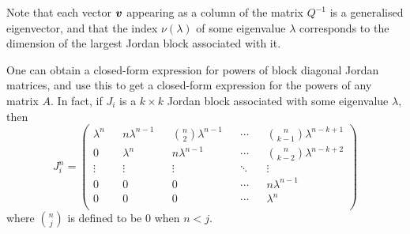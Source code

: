 Note that each vector $\boldsymbol{v}$ appearing as a column of the
matrix $Q^{-1}$ is a generalised eigenvector, and that the
index $\nu(\lambda)$ of some eigenvalue $\lambda$ corresponds to the
dimension of the largest Jordan block associated with it.

One can obtain a closed-form expression for powers of block diagonal
Jordan matrices, and use this to get a closed-form expression for
the powers of any matrix $A$. In fact, if $J_{i}$ is a
$k\times k$ Jordan block associated with some eigenvalue $\lambda$,
then
\begin{equation}
\label{eq:jordan_powers}
J_{i}^{n}=\begin{pmatrix}
\lambda^{n}	&&	n\lambda^{n-1}	&&	{n\choose 2}\lambda^{n-1}	&&
\cdots		&&	{n\choose k-1}\lambda^{n-k+1}				\\
0			&&	\lambda^{n}		&&	n\lambda^{n-1}				&&
\cdots		&&	{n\choose k-2}\lambda^{n-k+2}				\\
\vdots	&&	\vdots	&&	\vdots	&&	\ddots	&&	\vdots			\\
0		&&	0		&&	0		&&	\cdots	&&	n\lambda^{n-1}	\\
0		&&	0		&&	0		&&	\cdots	&&	\lambda^{n}		\\
\end{pmatrix}
\end{equation}
where ${n\choose j}$ is defined to be $0$ when $n<j$.
